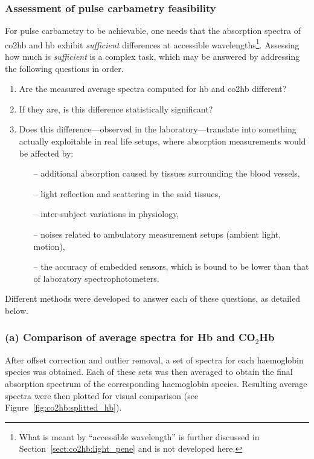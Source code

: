 \subsubsection{Assessment of pulse carbametry feasibility}

For pulse carbametry to be achievable, one needs that the absorption spectra of \gls{co2hb} and \gls{hb} exhibit \emph{sufficient} differences at accessible wavelengths\footnote{What is meant by \enquote{accessible wavelength} is further discussed in Section~\ref{sect:co2hb:light_pene} and is not developed here.}.
Assessing how much is \emph{sufficient} is a complex task, which may be answered by addressing the following questions in order.
\begin{enumerate}[label=(\alph*)]
	\item Are the measured average spectra computed for \gls{hb} and \gls{co2hb} different?
	\item If they are, is this difference statistically significant?
	\item Does this difference---observed in the laboratory---translate into something actually exploitable in real life setups, where absorption measurements would be affected by:
	\begin{itemize}
		\item[--] additional absorption caused by tissues surrounding the blood vessels,
		\item[--] light reflection and scattering in the said tissues,
		\item[--] inter-subject variations in physiology,
		\item[--] noises related to ambulatory measurement setups (ambient light, motion),
		\item[--] the accuracy of embedded sensors, which is bound to be lower than that of laboratory spectrophotometers.
	\end{itemize}
\end{enumerate}

Different methods were developed to answer each of these questions, as detailed below.

\subsubsection*{(a) Comparison of average spectra for Hb and \texorpdfstring{CO\(_2\)Hb}{CO2Hb}}

After offset correction and outlier removal, a set of spectra for each haemoglobin species was obtained.
Each of these sets was then averaged to obtain the final absorption spectrum of the corresponding haemoglobin species.
Resulting average spectra were then plotted for visual comparison (see Figure~\ref{fig:co2hb:splitted_hb}).

